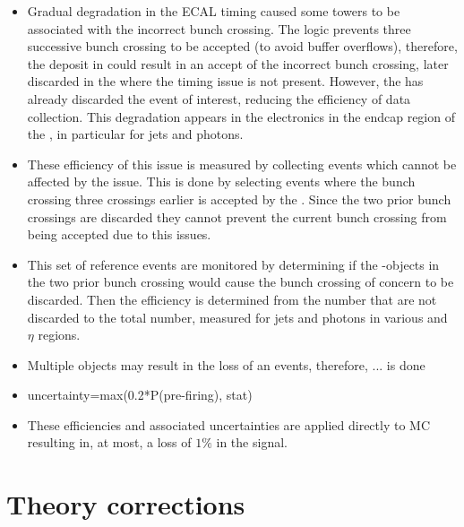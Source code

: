 \begin{itemize}
    \item Gradual degradation in the ECAL timing caused some \HWT \ECAL towers to be associated with the incorrect bunch crossing. The \HWT logic prevents three successive bunch crossing to be accepted (to avoid buffer overflows), therefore, the deposit in \ECAL could result in an \SWT accept of the incorrect bunch crossing, later discarded in the \HWT where the timing issue is not present. However, the \HWT has already discarded the event of interest, reducing the efficiency of data collection. This degradation appears in the electronics in the endcap region of the \ECAL, in particular for jets and photons.
    \item These efficiency of this issue is measured by collecting events which cannot be affected by the issue. This is done by selecting events where the bunch crossing three crossings earlier is accepted by the \HWT. Since the two prior bunch crossings are discarded they cannot prevent the current bunch crossing from being accepted due to this issues.
    \item This set of reference events are monitored by determining if the \HWT-objects in the two prior bunch crossing would cause the bunch crossing of concern to be discarded. Then the efficiency is determined from the number that are not discarded to the total number, measured for jets and photons in various \pt and $\eta$ regions.
    \item Multiple objects may result in the loss of an events, therefore, ... is done
    \item uncertainty=max(0.2*P(pre-firing), stat)
    \item These efficiencies and associated uncertainties are applied directly to MC resulting in, at most, a loss of $1\%$ in the signal.
\end{itemize}


\section{Theory corrections}

